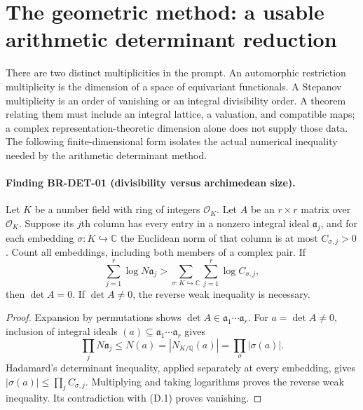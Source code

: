 \section{The geometric method: a usable arithmetic determinant reduction}
\label{sec:root-method}

There are two distinct multiplicities in the prompt.  An automorphic
restriction multiplicity is the dimension of a space of equivariant
functionals.  A Stepanov multiplicity is an order of vanishing or an
integral divisibility order.  A theorem relating them must include an
integral lattice, a valuation, and compatible maps; a complex
representation-theoretic dimension alone does not supply those data.
The following finite-dimensional form isolates the actual numerical
inequality needed by the arithmetic determinant method.

\paragraph{Finding BR-DET-01 (divisibility versus archimedean size).}
Let $K$ be a number field with ring of integers $\mathcal O_K$.
Let $A$ be an $r\times r$ matrix over $\mathcal O_K$.  Suppose its
$j$th column has every entry in a nonzero integral ideal $\mathfrak a_j$,
and for each embedding $\sigma:K\hookrightarrow\mathbb C$ the
Euclidean norm of that column is at most $C_{\sigma,j}>0$.
Count all embeddings, including both members of a complex pair.
If
\[
 \sum_{j=1}^r\log N\mathfrak a_j
   >\sum_{\sigma:K\hookrightarrow\mathbb C}
                     \sum_{j=1}^r\log C_{\sigma,j},             \tag{D.1}
\]
then $\det A=0$.  If $\det A\ne0$, the reverse weak inequality
is necessary.

\begin{proof}
Expansion by permutations shows
$\det A\in\mathfrak a_1\cdots\mathfrak a_r$.
For $a=\det A\ne0$, inclusion of integral ideals
$(a)\subseteq\mathfrak a_1\cdots\mathfrak a_r$ gives
\[
 \prod_jN\mathfrak a_j
 \leq N(a)=|N_{K/\mathbb Q}(a)|
 =\prod_\sigma|\sigma(a)|.
\]
Hadamard's determinant inequality, applied separately at every
embedding, gives
$|\sigma(a)|\leq\prod_j C_{\sigma,j}$.
Multiplying and taking logarithms proves the reverse weak
inequality.  Its contradiction with (D.1) proves vanishing.
\end{proof}


